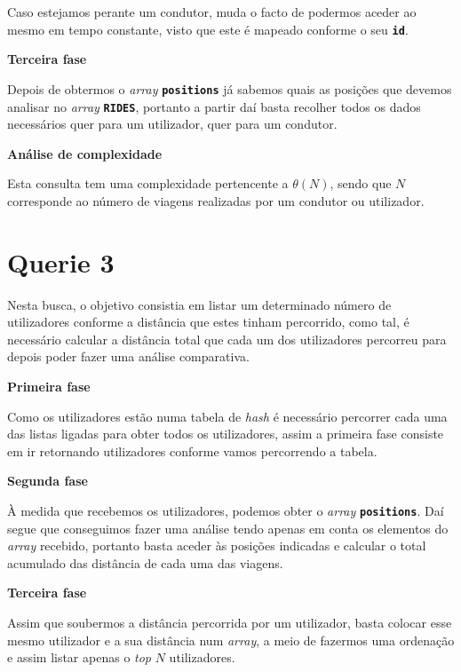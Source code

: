 \documentclass[12pt,a4paper]{report}
\begin{document}
Caso estejamos perante um condutor, muda o facto de podermos aceder ao mesmo em tempo constante, visto que este é mapeado conforme o seu \textbf{\small\texttt{id}}.

\normalsize\textbf{Terceira fase }{\titlerule[0.5pt]}

Depois de obtermos o \textit{array} \textbf{\small\texttt{positions}} já sabemos quais as posições que devemos analisar no \textit{array} \textbf{\small\texttt{RIDES}}, portanto a partir daí basta recolher todos os dados necessários quer para um utilizador, quer para um condutor.

\normalsize\textbf{Análise de complexidade }{\titlerule[0.5pt]}

Esta consulta tem uma complexidade pertencente a \(\theta(N)\), sendo que \(N\) corresponde ao número de viagens realizadas por um condutor ou utilizador.

\vspace{-6pt}
\section{Querie 3}

Nesta busca, o objetivo consistia em listar um determinado número de utilizadores conforme a distância que estes tinham percorrido, como tal, é necessário calcular a distância total que cada um dos utilizadores percorreu para depois poder fazer uma análise comparativa.

\normalsize\textbf{Primeira fase }{\titlerule[0.5pt]}

Como os utilizadores estão numa tabela de \textit{hash} é necessário percorrer cada uma das listas ligadas para obter todos os utilizadores, assim a primeira fase consiste em ir retornando utilizadores conforme vamos percorrendo a tabela.

\normalsize\textbf{Segunda fase }{\titlerule[0.5pt]}

À medida que recebemos os utilizadores, podemos obter o \textit{array} \textbf{\small\texttt{positions}}. Daí segue que conseguimos fazer uma análise tendo apenas em conta os elementos do \textit{array} recebido, portanto basta aceder às posições indicadas e calcular o total acumulado das distância de cada uma das viagens.

\normalsize\textbf{Terceira fase }{\titlerule[0.5pt]}

Assim que soubermos a distância percorrida por um utilizador, basta colocar esse mesmo utilizador e a sua distância num \textit{array}, a meio de fazermos uma ordenação e assim listar apenas o \textit{top} \(N\) utilizadores.
\end{document}
